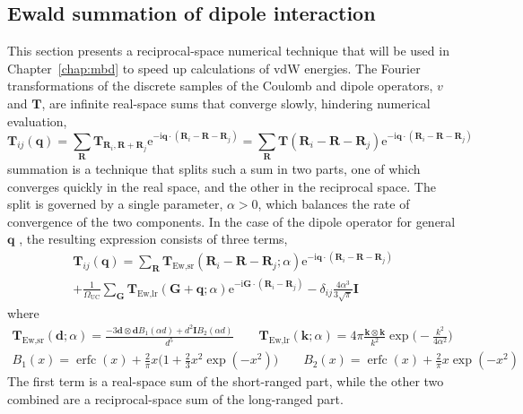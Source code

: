 \subsection{Ewald summation of dipole interaction}

This section presents a reciprocal-space numerical technique that will be used in Chapter~\ref{chap:mbd} to speed up calculations of vdW energies.
The Fourier transformations of the discrete samples of the Coulomb and dipole operators, $v$ and $\mathbf T$, are infinite real-space sums that converge slowly, hindering numerical evaluation,
\begin{equation}
  \mathbf T_{ij}(\mathbf q)=\sum_\mathbf R\mathbf T_{\mathbf R_i,\mathbf R+\mathbf R_j}\mathrm e^{-\mathrm i\mathbf q\cdot(\mathbf R_i-\mathbf R-\mathbf R_j)}=\sum_\mathbf R\mathbf T(\mathbf R_i-\mathbf R-\mathbf R_j)\mathrm e^{-\mathrm i\mathbf q\cdot(\mathbf R_i-\mathbf R-\mathbf R_j)}
\end{equation}
\citet{EwaldAP21} summation is a technique that splits such a sum in two parts, one of which converges quickly in the real space, and the other in the reciprocal space.
The split is governed by a single parameter, $\alpha>0$, which balances the rate of convergence of the two components.
In the case of the dipole operator for general $\mathbf q$ \citep{BowdenJPCSSP81}, the resulting expression consists of three terms,
\begin{multline}
  \mathbf T_{ij}(\mathbf q)=\sum_\mathbf R\mathbf T_\text{Ew,sr}(\mathbf R_i-\mathbf R-\mathbf R_j;\alpha)\mathrm e^{-\mathrm i\mathbf q\cdot(\mathbf R_i-\mathbf R-\mathbf R_j)} \\
  +\frac1{\Omega_\text{UC}}\sum_{\mathbf G}\mathbf T_\text{Ew,lr}(\mathbf G+\mathbf q;\alpha)\mathrm e^{-\mathrm i\mathbf G\cdot(\mathbf R_i-\mathbf R_j)}
  -\delta_{ij}\frac{4\alpha^3}{3\sqrt{\pi}}\mathbf I
  \label{eq:ewald}
\end{multline}
where
\begin{gather}
  \mathbf T_\text{Ew,sr}(\mathbf d;\alpha)=\frac{-3\mathbf d\otimes\mathbf dB_1(\alpha d)+d^2\mathbf IB_2(\alpha d)}{d^5} \qquad
  \mathbf T_\text{Ew,lr}(\mathbf k;\alpha)=4\pi\frac{\mathbf k\otimes\mathbf k}{k^2}\exp\bigg(-\frac{k^2}{4\alpha^2}\bigg) \\
  B_1(x)=\operatorname{erfc}(x)+\tfrac2\pi x\big(1+\tfrac23x^2\exp(-x^2)\!\big)\qquad
  B_2(x)=\operatorname{erfc}(x)+\tfrac2\pi x\exp(-x^2)
\end{gather}
The first term is a real-space sum of the short-ranged part, while the other two combined are a reciprocal-space sum of the long-ranged part.

